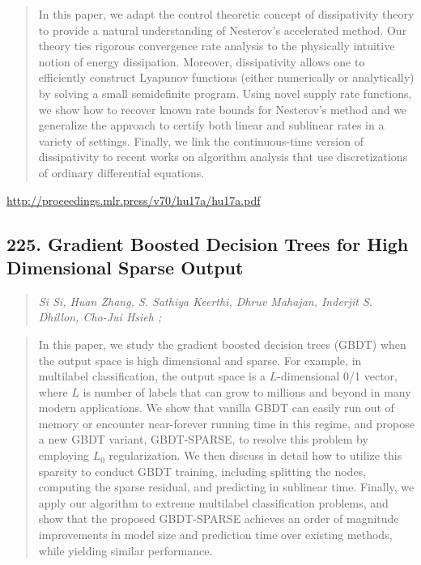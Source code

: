 \documentclass{article}
\begin{document}
\begin{quote}
    In this paper, we adapt the control theoretic concept of dissipativity theory to provide a natural understanding of Nesterov’s accelerated method. Our theory ties rigorous convergence rate analysis to the physically intuitive notion of energy dissipation. Moreover, dissipativity allows one to efficiently construct Lyapunov functions (either numerically or analytically) by solving a small semidefinite program. Using novel supply rate functions, we show how to recover known rate bounds for Nesterov’s method and we generalize the approach to certify both linear and sublinear rates in a variety of settings. Finally, we link the continuous-time version of dissipativity to recent works on algorithm analysis that use discretizations of ordinary differential equations.  
\end{quote}

\href{http://proceedings.mlr.press/v70/hu17a/hu17a.pdf}{http://proceedings.mlr.press/v70/hu17a/hu17a.pdf}

\subsection{225. Gradient Boosted Decision Trees for High Dimensional Sparse Output}

\begin{quote}
\footnotesize{\textit{Si Si, Huan Zhang, S. Sathiya Keerthi, Dhruv Mahajan, Inderjit S. Dhillon, Cho-Jui Hsieh ;}}

\end{quote}

\begin{quote}
    In this paper, we study the gradient boosted decision trees (GBDT) when the output space is high dimensional and sparse. For example, in multilabel classification, the output space is a $L$-dimensional 0/1 vector, where $L$ is number of labels that can grow to millions and beyond in many modern applications. We show that vanilla GBDT can easily run out of memory or encounter near-forever running time in this regime, and propose a new GBDT variant, GBDT-SPARSE, to resolve this problem by employing $L_0$ regularization. We then discuss in detail how to utilize this sparsity to conduct GBDT training, including splitting the nodes, computing the sparse residual, and predicting in sublinear time. Finally, we apply our algorithm to extreme multilabel classification problems, and show that the proposed GBDT-SPARSE achieves an order of magnitude improvements in model size and prediction time over existing methods, while yielding similar performance.  
\end{quote}
\end{document}
